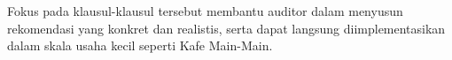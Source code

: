 \documentclass[12pt, a4paper]{report}
\begin{document}
Fokus pada klausul-klausul tersebut membantu auditor dalam menyusun rekomendasi yang konkret dan realistis, serta dapat langsung diimplementasikan dalam skala usaha kecil seperti Kafe Main-Main.








\end{document}
